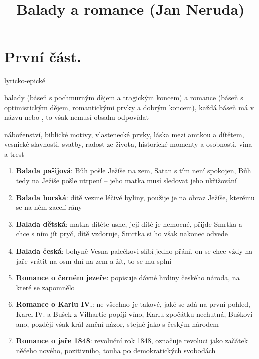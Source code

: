 \documentclass{article}
\title{\vspace{-2cm}Balady a romance (Jan Neruda)\vspace{-2cm}}
\date{}
\author{}
\begin{document}
\maketitle
\section{První část.}
\begin{description}
    \setlength\itemsep{0.15em}
    \item[druh:] lyricko-epické
    \item[žánr:] balady (báseň s pochmurným dějem a tragickým koncem) a romance (báseň s optimistickým dějem, romantickými prvky a dobrým koncem), každá báseň má v názvu  nebo , to však nemusí obsahu odpovídat
    \item[téma:] náboženství, biblické motivy, vlastenecké prvky, láska mezi amtkou a dítětem, vesnické slavnosti, svatby, radost ze života, historické momenty a osobnosti, vina a trest
    \item[motivy:] \begin{enumerate}
        \vspace{-0.5em}
        \setlength\itemsep{0.15em}
        \item \textbf{Balada pašijová}: Bůh pošle Ježíše na zem, Satan s tím není spokojen, Bůh tedy na Ježíše pošle utrpení -- jeho matka musí sledovat jeho ukřižování
        \item \textbf{Balada horská}: dítě vezme léčivé byliny, použije je na obraz Ježíše, kterému se na něm zacelí rány
        \item \textbf{Balada dětská}: matka dítěte usne, její dítě je nemocné, přijde Smrtka a chce s ním jít pryč, dítě vzdoruje, Smrtka si ho však nakonec odvede
        \item \textbf{Balada česká}: bohyně Vesna palečkovi slíbí jedno přání, on se chce vždy na jaře vrátit na osm dní na zem a žít, to se mu splní
        \item \textbf{Romance o černém jezeře}: popisuje dávné hrdiny českého národa, na které se zapomnělo
        \item \textbf{Romance o Karlu IV.}: ne všechno je takové, jaké se zdá na první pohled, Karel IV. a Bušek z Vilhartic popíjí víno, Karlu zpočátku nechutná, Buškovi ano, později však král změní názor, stejně jako s českým národem
        \item \textbf{Romance o jaře 1848}: revoluční rok 1848, označuje revoluci jako začátek něčeho nového, pozitivního, touha po demokratických svobodách

\end{enumerate}
\end{description}
\end{document}
